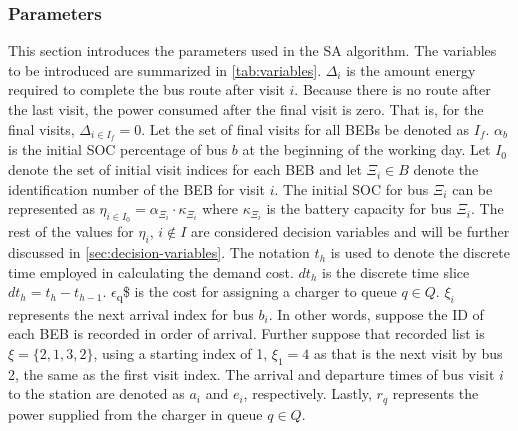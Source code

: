 \documentclass[11pt,a4paper,final]{article}
\newcommand{\Isetinit}{I_0}                 %
\newcommand{\Isetfinal}{I_f}                %
\begin{document}
\subsubsection{Parameters}
\label{sec:input-variables}
This section introduces the parameters used in the SA algorithm. The variables to be introduced are summarized in
\ref{tab:variables}. \(\Delta_i\) is the amount energy required to complete the bus route after visit \(i\). Because there is no route
after the last visit, the power consumed after the final visit is zero. That is, for the final visits, \(\Delta_{i \in
\Isetfinal} = 0\). Let the set of final visits for all BEBs be denoted as \(\Isetfinal\). \(\alpha_b\) is the initial SOC
percentage of bus \(b\) at the beginning of the working day. Let \(\Isetinit\) denote the set of initial visit indices for
each BEB and let \(\Xi_i \in B\) denote the identification number of the BEB for visit \(i\). The initial SOC for bus \(\Xi_i\) can
be represented as \(\eta_{i \in \Isetinit} = \alpha_{\Xi_i} \cdot \kappa_{\Xi_i}\) where \(\kappa_{\Xi_i}\) is the battery capacity for bus \(\Xi_i\). The
rest of the values for \(\eta_i\), \(i \not\in I\) are considered decision variables and will be further discussed in
\ref{sec:decision-variables}. The notation \(t_h\) is used to denote the discrete time employed in calculating the demand cost.
\(dt_h\) is the discrete time slice \(dt_h = t_h - t_{h-1}\). \(\epsilon\)\textsubscript{q}\$ is the cost for assigning a charger to queue \(q \in Q\).
\(\xi_i\) represents the next arrival index for bus \(b_i\). In other words, suppose the ID of each BEB is recorded in order
of arrival. Further suppose that recorded list is \(\xi = \{ 2,1,3,2 \}\), using a starting index of 1, \(\xi_1 = 4\) as that is
the next visit by bus 2, the same as the first visit index. The arrival and departure times of bus visit \(i\) to the
station are denoted as \(a_i\) and \(e_i\), respectively. Lastly, \(r_q\) represents the power supplied from the charger in
queue \(q \in Q\).
\end{document}
